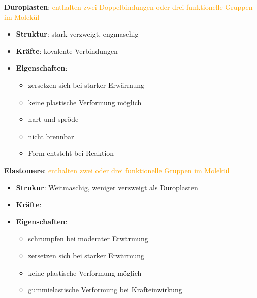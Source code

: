 \textbf{Duroplasten}: \textcolor{orange}{enthalten zwei Doppelbindungen oder drei funktionelle Gruppen im Molekül}
\begin{itemize}
    \item \textbf{Struktur}: stark verzweigt, engmaschig
    \item \textbf{Kräfte}: kovalente Verbindungen
    \item \textbf{Eigenschaften}:
        \begin{itemize}
            \item zersetzen sich bei starker Erwärmung
            \item keine plastische Verformung möglich
            \item hart und spröde
            \item nicht brennbar
            \item Form entsteht bei Reaktion
        \end{itemize}
\end{itemize}

\textbf{Elastomere}: \textcolor{orange}{enthalten zwei oder drei funktionelle Gruppen im Molekül}
\begin{itemize}
    \item \textbf{Strukur}: Weitmaschig, weniger verzweigt als Duroplasten
    \item \textbf{Kräfte}:
    \item \textbf{Eigenschaften}: 
        \begin{itemize}
            \item schrumpfen bei moderater Erwärmung
            \item zersetzen sich bei starker Erwärmung
            \item keine plastische Verformung möglich
            \item gummielastische Verformung bei Krafteinwirkung
        \end{itemize}
\end{itemize}
